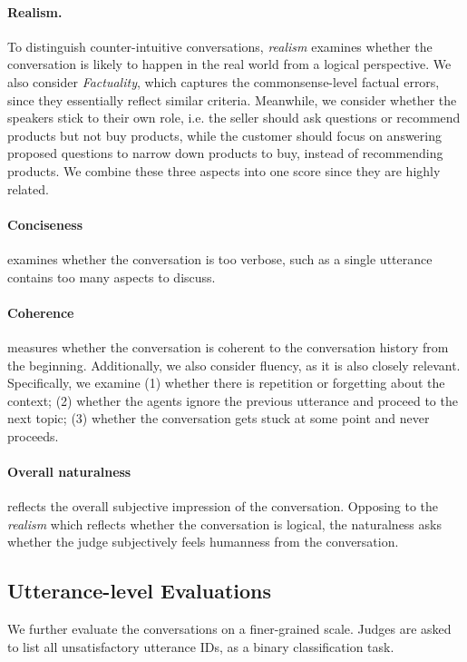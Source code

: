 \paragraph{Realism.} To distinguish counter-intuitive conversations, \textit{realism} examines whether the conversation is likely to happen in the real world from a logical perspective. We also consider \textit{Factuality}, which captures the commonsense-level factual errors, since they essentially reflect similar criteria. Meanwhile, we consider whether the speakers stick to their own role, i.e. the seller should ask questions or recommend products but not buy products, while the customer should focus on answering proposed questions to narrow down products to buy, instead of recommending products. %
We combine these three aspects into one score since they are highly related.

\paragraph{Conciseness} examines whether the conversation is too verbose, such as a single utterance contains too many aspects to discuss.

\paragraph{Coherence} measures whether the conversation is coherent to the conversation history from the beginning. Additionally, we also consider fluency, as it is also closely relevant. Specifically, we examine (1) whether there is repetition or forgetting about the context; (2) whether the agents ignore the previous utterance and proceed to the next topic; (3) whether the conversation gets stuck at some point and never proceeds.

\paragraph{Overall naturalness} reflects the overall subjective impression of the conversation. Opposing to the \textit{realism} which reflects whether the conversation is logical, the naturalness asks whether the judge subjectively feels humanness from the conversation.

\subsection{Utterance-level Evaluations}
We further evaluate the conversations on a finer-grained scale. Judges are asked to list all unsatisfactory utterance IDs, as a binary classification task.

